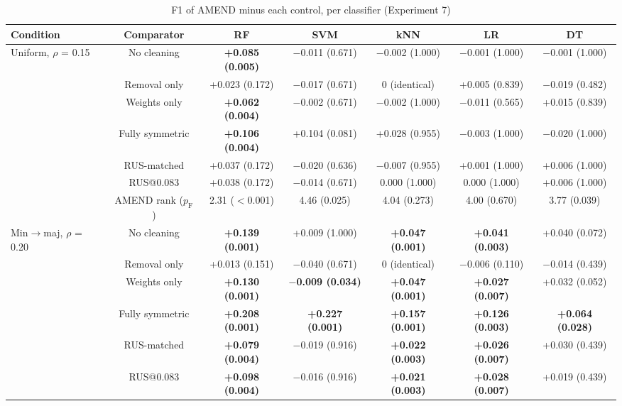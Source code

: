 \documentclass[conference]{IEEEtran}
\begin{document}
\begin{table}[!t]
\centering
\footnotesize
\caption{F1 of AMEND minus each control, per classifier (Experiment 7)}
\label{tab:10}
\setlength{\tabcolsep}{3.5pt}
\begin{adjustbox}{max width=\linewidth}
\begin{tabular}{lcccccc}
\hline
Condition & Comparator & RF & SVM & kNN & LR & DT \\
\hline
Uniform, $\rho $ = 0.15 & No cleaning & \textbf{+0.085 (0.005)} & $-$0.011 (0.671) & $-$0.002 (1.000) & $-$0.001 (1.000) & $-$0.001 (1.000) \\
& Removal only & +0.023 (0.172) & $-$0.017 (0.671) & 0 (identical) & +0.005 (0.839) & $-$0.019 (0.482) \\
& Weights only & \textbf{+0.062 (0.004)} & $-$0.002 (0.671) & $-$0.002 (1.000) & $-$0.011 (0.565) & +0.015 (0.839) \\
& Fully symmetric & \textbf{+0.106 (0.004)} & +0.104 (0.081) & +0.028 (0.955) & $-$0.003 (1.000) & $-$0.020 (1.000) \\
& RUS-matched & +0.037 (0.172) & $-$0.020 (0.636) & $-$0.007 (0.955) & +0.001 (1.000) & +0.006 (1.000) \\
& RUS@0.083 & +0.038 (0.172) & $-$0.014 (0.671) & 0.000 (1.000) & 0.000 (1.000) & +0.006 (1.000) \\
& AMEND rank ($p_{\mathrm{F}}$) & 2.31 ($<$0.001) & 4.46 (0.025) & 4.04 (0.273) & 4.00 (0.670) & 3.77 (0.039) \\
Min$\rightarrow $maj, $\rho $ = 0.20 & No cleaning & \textbf{+0.139 (0.001)} & +0.009 (1.000) & \textbf{+0.047 (0.001)} & \textbf{+0.041 (0.003)} & +0.040 (0.072) \\
& Removal only & +0.013 (0.151) & $-$0.040 (0.671) & 0 (identical) & $-$0.006 (0.110) & $-$0.014 (0.439) \\
& Weights only & \textbf{+0.130 (0.001)} & \textbf{$-$0.009 (0.034)} & \textbf{+0.047 (0.001)} & \textbf{+0.027 (0.007)} & +0.032 (0.052) \\
& Fully symmetric & \textbf{+0.208 (0.001)} & \textbf{+0.227 (0.001)} & \textbf{+0.157 (0.001)} & \textbf{+0.126 (0.003)} & \textbf{+0.064 (0.028)} \\
& RUS-matched & \textbf{+0.079 (0.004)} & $-$0.019 (0.916) & \textbf{+0.022 (0.003)} & \textbf{+0.026 (0.007)} & +0.030 (0.439) \\
& RUS@0.083 & \textbf{+0.098 (0.004)} & $-$0.016 (0.916) & \textbf{+0.021 (0.003)} & \textbf{+0.028 (0.007)} & +0.019 (0.439) \\

\end{tabular}
\end{adjustbox}
\end{table}
\end{document}
